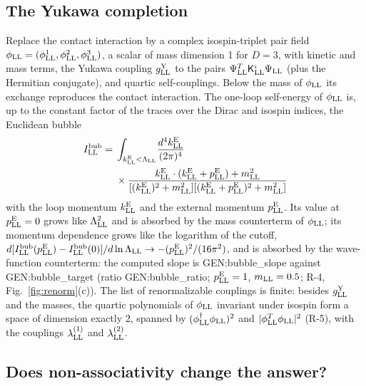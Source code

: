 \subsection{The Yukawa completion}

Replace the contact interaction by a complex isospin-triplet pair field $\phi_{\rm LL}=(\phi^1_{\rm
LL},\phi^2_{\rm LL},\phi^3_{\rm LL})$, a scalar of mass dimension 1 for $D=3$, with kinetic and mass
terms, the Yukawa coupling $g^{\rm Y}_{\rm LL}$ to the pairs $\Psi^T_{\rm LL}\mathsf K^\iota_{\rm LL}\Psi_{\rm
LL}$ (plus the Hermitian conjugate), and quartic self-couplings. Below the mass of $\phi_{\rm LL}$ its
exchange reproduces the contact interaction. The one-loop self-energy of $\phi_{\rm LL}$ is, up to the
constant factor of the traces over the Dirac and isospin indices, the Euclidean bubble
\begin{align}
I^{\rm bub}_{\rm LL}={}&\int_{k^{\rm E}_{\rm LL}<\Lambda_{\rm LL}}\!\frac{d^4k^{\rm E}_{\rm LL}}{(2\pi)^4}\nonumber\\
&\times\frac{k^{\rm E}_{\rm LL}\cdot(k^{\rm E}_{\rm LL}+p^{\rm E}_{\rm LL})+m_{\rm LL}^2}{[(k^{\rm E}_{\rm LL})^2+m_{\rm LL}^2][(k^{\rm E}_{\rm LL}+p^{\rm E}_{\rm LL})^2+m_{\rm LL}^2]}
\label{eq:bubble}
\end{align}
with the loop momentum $k^{\rm E}_{\rm LL}$ and the external momentum $p^{\rm E}_{\rm LL}$. Its value at
$p^{\rm E}_{\rm LL}=0$ grows like $\Lambda_{\rm LL}^2$ and is absorbed by the mass counterterm of
$\phi_{\rm LL}$; its momentum dependence grows like the logarithm of the cutoff, $d[I^{\rm bub}_{\rm
LL}(p^{\rm E}_{\rm LL})-I^{\rm bub}_{\rm LL}(0)]/d\ln\Lambda_{\rm LL}\to-(p^{\rm E}_{\rm LL})^2/(16\pi^2)$, and
is absorbed by the wave-function counterterm: the computed slope is {{GEN:bubble_slope}} against
{{GEN:bubble_target}} (ratio {{GEN:bubble_ratio}}; $p^{\rm E}_{\rm LL}=1$, $m_{\rm LL}=0.5$; R-4,
Fig.~\ref{fig:renorm}(c)). The list of renormalizable couplings is finite: besides $g^{\rm Y}_{\rm LL}$
and the masses, the quartic polynomials of $\phi_{\rm LL}$ invariant under isospin form a space of
dimension exactly 2, spanned by $(\phi^\dagger_{\rm LL}\phi_{\rm LL})^2$ and $\lvert\phi^T_{\rm
LL}\phi_{\rm LL}\rvert^2$ (R-5), with the couplings $\lambda^{(1)}_{\rm LL}$ and $\lambda^{(2)}_{\rm LL}$.

\subsection{Does non-associativity change the answer?}

